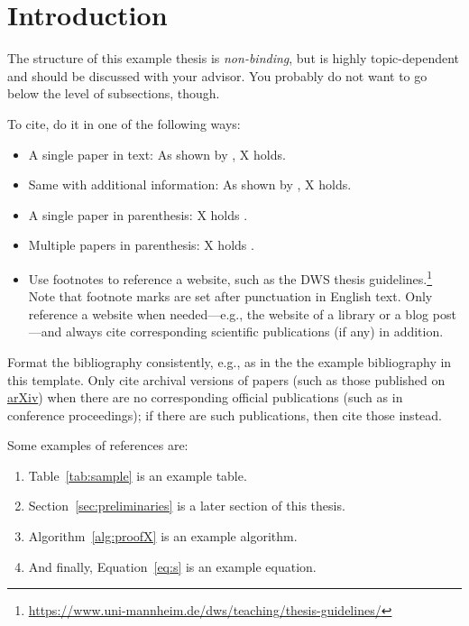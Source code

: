 \documentclass[a4paper,oneside,bibliography=totoc]{scrbook}
\begin{document}
\begingroup%
\hypersetup{hidelinks}%
\tableofcontents%
\endgroup



\mainmatter

\chapter{Introduction}
\label{ch:intro}

The structure of this example thesis is \emph{non-binding}, but is highly
topic-dependent and should be discussed with your advisor. You probably do not
want to go below the level of subsections, though.

To cite, do it in one of the following ways:
\begin{itemize}
\item A single paper in text: As shown by \citet{doe2024proof}, X holds.
\item Same with additional information: As shown by \citet[p. 20]{doe2024proof},
  X holds.
\item A single paper in parenthesis: X holds \cite{doe2024proof}.
\item Multiple papers in parenthesis: X holds
  \cite{brown2022techreport,smith2023conference,lee2023journal,doe2024proof}.
\item Use footnotes to reference a website, such as the DWS thesis
  guidelines.\footnote{\url{https://www.uni-mannheim.de/dws/teaching/thesis-guidelines/}}
  Note that footnote marks are set after punctuation in English text. Only
  reference a website when needed---e.g., the website of a library or a blog
  post---and always cite corresponding scientific publications (if any) in
  addition.
\end{itemize}
Format the bibliography consistently, e.g., as in the the example bibliography
in this template. Only cite archival versions of papers (such as those published
on \href{https://arxiv.org}{arXiv}) when there are no corresponding official
publications (such as in conference proceedings); if there are such
publications, then cite those instead.


Some examples of references are:
\begin{enumerate}
\item Table~\ref{tab:sample} is an example table.
\item Section~\ref{sec:preliminaries} is a later section of this thesis.
\item Algorithm~\ref{alg:proofX} is an example algorithm.
\item And finally, Equation~\eqref{eq:s} is an example equation.
\end{enumerate}
\end{document}

